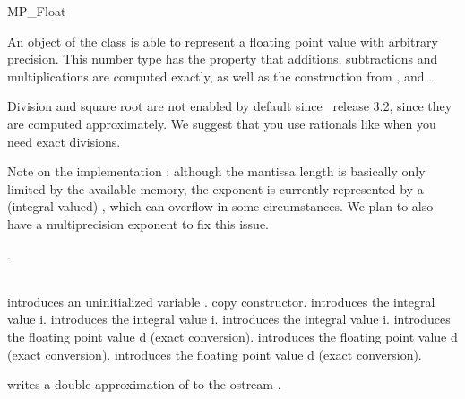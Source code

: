 
\begin{ccRefClass} {MP_Float}

\ccDefinition
An object of the class  is able to represent a floating point
value with arbitrary precision.  This number type has the property that
additions, subtractions and multiplications are computed exactly, as well as
the construction from ,  and .

Division and square root are not enabled by default since \cgal\ release 3.2,
since they are computed approximately.  We suggest that you use
rationals like  when you need exact divisions.

Note on the implementation : although the mantissa length is basically only
limited by the available memory, the exponent is currently represented by a
(integral valued) , which can overflow in some circumstances.  We
plan to also have a multiprecision exponent to fix this issue.


\ccIsModel
{}.\\
\\

\ccCreation
{}

{introduces an uninitialized variable \ccVar.}
\ccGlue
{}
{copy constructor.}
\ccGlue
{}
{introduces the integral value i.}
\ccGlue
{}
{introduces the integral value i.}
\ccGlue
{}
{introduces the integral value i.}
\ccGlue
{}
{introduces the floating point value d (exact conversion).}
\ccGlue
{}
{introduces the floating point value d (exact conversion).}
\ccGlue
{}
{introduces the floating point value d (exact conversion).}

\ccOperations

{writes a double approximation of  to the ostream .}


\end{ccRefClass}
